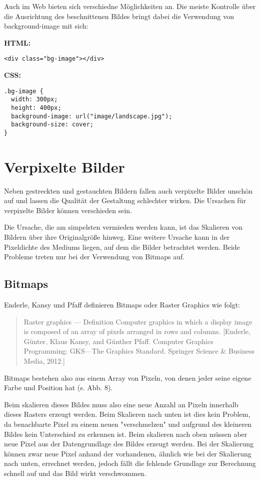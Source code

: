 Auch im Web bieten sich verschiedne Möglichkeiten an.
Die meiste Kontrolle über die Ausrichtung des beschnittenen Bildes bringt dabei die Verwendung von background-image mit sich:

\textbf{HTML:}
\begin{lstlisting}
<div class="bg-image"></div>
\end{lstlisting}

\textbf{CSS:}
\begin{lstlisting}
.bg-image {
  width: 300px;
  height: 400px;
  background-image: url("image/landscape.jpg");
  background-size: cover;
}
\end{lstlisting}

\section{Verpixelte Bilder}
Neben gestreckten und gestauchten Bildern fallen auch verpixelte Bilder unschön auf und lassen die Qualität der Gestaltung schlechter wirken. Die Ursachen für verpixelte Bilder können verschieden sein.

Die Ursache, die am simpelsten vermieden werden kann, ist das Skalieren von Bildern über ihre Originalgröße hinweg. Eine weitere Ursache kann in der Pixeldichte des Mediums liegen, auf dem die Bilder betrachtet werden.
Beide Probleme treten nur bei der Verwendung von Bitmaps auf.

\subsection{Bitmaps}
Enderle, Kansy und Pfaff definieren Bitmaps oder Raster Graphics wie folgt:

\begin{quote}
Raster graphics — Definition
Computer graphics in which a display image is composed of an array of pixels arranged in rows and columns. [Enderle, Günter, Klaus Kansy, and Günther Pfaff. Computer Graphics Programming: GKS—The Graphics Standard. Springer Science & Business Media, 2012.]
\end{quote}

Bitmaps bestehen also aus einem Array von Pixeln, von denen jeder seine eigene Farbe und Position hat (s. Abb. 8).


Beim skalieren dieses Bildes muss also eine neue Anzahl an Pixeln innerhalb dieses Rasters erzeugt werden. Beim Skalieren nach unten ist dies kein Problem, da benachbarte Pixel zu einem neuen "verschmelzen" und aufgrund des kleineren Bildes kein Unterschied zu erkennen ist.
Beim skalieren nach oben müssen aber neue Pixel aus der Datengrundlage des Bildes erzeugt werden. Bei der Skalierung können zwar neue Pixel anhand der vorhandenen, ähnlich wie bei der Skalierung nach unten, errechnet werden, jedoch fällt die fehlende Grundlage zur Berechnung schnell auf und das Bild wirkt verschwommen.

